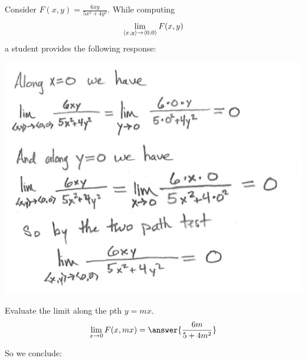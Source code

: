 \documentclass{ximera}
\author{Jim Talamo \and Bart Snapp}
\begin{document}
\begin{exercise}
  Consider $F(x,y) = \frac{6xy}{5x^2+4y^2}$. While computing
  \[
  \lim_{\left\langle x,y\right\rangle\to \left\langle 0,0\right\rangle} F(x,y)
  \]
  a student provides the following response:
  \begin{image}
    \includegraphics{studentWork.png}
  \end{image}
  \begin{multipleChoice}
  \end{multipleChoice}
  \begin{exercise}
    Evaluate the limit along the pth $y=mx$.
    \[
    \lim_{x\to 0 }F(x,mx) = \answer{\frac{6 m}{5+4m^2}}
    \]
    \begin{exercise}
      So we conclude:
      \begin{multipleChoice}
      \end{multipleChoice}
    \end{exercise}
  \end{exercise}
\end{exercise}
\end{document}
